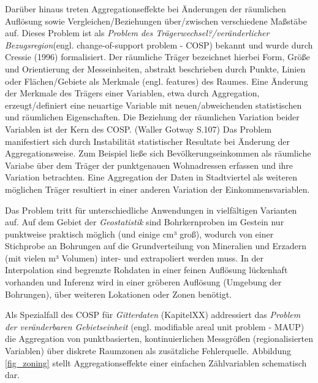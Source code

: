 Darüber hinaus treten Aggregationseffekte bei Änderungen der räumlichen Auflösung sowie Vergleichen/Beziehungen über/zwischen verschiedene Maßstäbe auf.
Dieses Problem ist als \emph{Problem des Trägerwechsel?/veränderlicher Bezugsregion}(engl. change-of-support problem - COSP) bekannt und 
wurde durch Cressie (1996) formalisiert. Der räumliche Träger bezeichnet hierbei Form, Größe und Orientierung der Messeinheiten, 
abstrakt beschrieben durch Punkte, Linien oder Flächen/Gebiete als Merkmale (engl. features) des Raumes. 
Eine Änderung der Merkmale des Trägers einer Variablen, etwa durch Aggregation, erzeugt/definiert eine neuartige Variable mit neuen/abweichenden statistischen und räumlichen Eigenschaften.
Die Beziehung der räumlichen Variation beider Variablen ist der Kern des COSP. (Waller Gotway S.107)
Das Problem manifestiert sich durch Instabilität statistischer Resultate bei Änderung der Aggregationsweise. 
Zum Beispiel ließe sich Bevölkerungseinkommen als räumliche Variabe über dem Träger der punktgenauen Wohnadressen erfassen und ihre Variation betrachten.
Eine Aggregation der Daten in Stadtviertel als weiteren möglichen Träger resultiert in einer anderen Variation der Einkommensvariablen.


Das Problem tritt für unterschiedliche Anwendungen in vielfältigen Varianten auf.  
Auf dem Gebiet der \emph{Geostatistik} sind Bohrkernproben im Gestein nur punktweise praktisch möglich (und einige cm³ groß), 
wodurch von einer Stichprobe an Bohrungen auf die Grundverteilung von Mineralien und Erzadern (mit vielen m³ Volumen) inter- und extrapoliert werden muss. 
In der Interpolation sind begrenzte Rohdaten in einer feinen Auflösung lückenhaft vorhanden und Inferenz wird in einer gröberen Auflösung (Umgebung der Bohrungen), 
über weiteren Lokationen oder Zonen benötigt.

Als Spezialfall des COSP für \emph{Gitterdaten} (KapitelXX) addressiert das \emph{Problem der veränderbaren Gebietseinheit} (engl. modifiable areal unit problem - MAUP)
die Aggregation von punktbasierten, kontinuierlichen Messgrößen (regionalisierten Variablen) über diskrete Raumzonen als zusätzliche Fehlerquelle. 
Abbildung \ref{fig_zoning} stellt Aggregationseffekte einer einfachen Zählvariablen schematisch dar.

